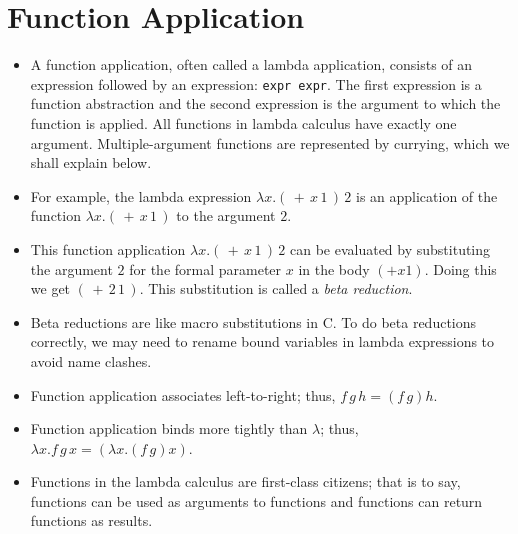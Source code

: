 \documentclass[]{article}
\begin{document}
\section{Function Application}
\begin{itemize}
\item A function application, often called a lambda application, consists of an
expression followed by an expression: \texttt{expr expr}. The first expression
is a function abstraction and the second expression is the argument to which the
function is applied. All functions in lambda calculus have exactly one argument.
Multiple-argument functions are represented by currying, which we shall explain
below.
\item For example, the lambda expression $\lambda x.(\,+\,x\,1\,)\,2$ is an
application of the function $\lambda x.(\,+\,x\,1\,)$ to the argument $2$.
\item This function application $\lambda x.(\,+\,x\,1\,)\,2$ can be evaluated by
substituting the argument $2$ for the formal parameter $x$ in the body $(+x1)$.
Doing this we get $(\,+\,2\,1\,)$. This substitution is called a \emph{beta
reduction}.
\item Beta reductions are like macro substitutions in C. To do beta reductions
correctly, we may need to rename bound variables in lambda expressions to avoid
name clashes.
\item Function application associates left-to-right; thus, $f\,g\,h=(f\,g)h$.
\item Function application binds more tightly than $\lambda$; thus, $\lambda
x.f\,g\,x=(\lambda x.(f\,g)x)$.
\item Functions in the lambda calculus are first-class citizens; that is to say,
functions can be used as arguments to functions and functions can return
functions as results.
\end{itemize}
\end{document}
